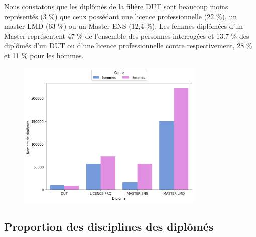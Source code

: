 \documentclass[12pt, a4paper, titlepage, table]{article}
\begin{document}
	Nous constatons que les diplômés de la filière DUT sont beaucoup moins représentés (3 \%) que ceux possédant une licence professionnelle (22 \%), un master LMD (63 \%) ou  un Master ENS (12,4 \%). Les femmes diplômées d'un Master représentent 47 \% de l'ensemble des personnes interrogées et 13.7 \% des diplômés d'un DUT ou d'une licence professionnelle contre respectivement, 28 \% et 11 \% pour les hommes.
	
		\begin{figure}[H]
			\centering
			\includegraphics[width=0.8\textwidth]{../graphs/nombre_diplome_genre.png}
			\label{fig:diplome_genre}
		\end{figure}      

\subsection{Proportion des disciplines des diplômés}
\end{document}
